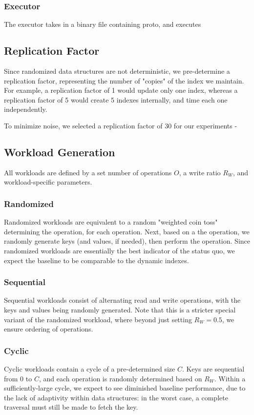 \documentclass[sigconf]{acmart}
\begin{document}
\subsubsection{Executor}
The executor takes in a binary file containing proto, and executes


\subsection{Replication Factor}
Since randomized data structures are not deterministic, we pre-determine a replication factor, representing the number of "copies" of the index we maintain. For example, a replication factor of 1 would update only one index, whereas a replication factor of 5 would create 5 indexes internally, and time each one independently.

To minimize noise, we selected a replication factor of 30 for our experiments - 
\cite{probdist}
\subsection {Workload Generation}
\label{workloads}

All workloads are defined by a set number of operations $O$, a write ratio $R_W$, and workload-specific parameters.

\subsubsection{Randomized}
Randomized workloads are equivalent to a random "weighted coin toss" determining the operation, for each operation. Next, based on a the operation, we randomly generate keys (and values, if needed), then perform the operation. Since randomized workloads are essentially the best indicator of the status quo, we expect the baseline to be comparable to the dynamic indexes.

\subsubsection{Sequential}
Sequential workloads consist of alternating read and write operations, with the keys and values being randomly generated. Note that this is a stricter special variant of the randomized workload, where beyond just setting $R_W=0.5$, we ensure ordering of operations.

\subsubsection{Cyclic}
Cyclic workloads contain a cycle of a pre-determined size $C$. Keys are sequential from $0$ to $C$, and each operation is randomly determined based on $R_W$. Within a sufficiently-large cycle, we expect to see diminished baseline performance, due to the lack of adaptivity within data structures: in the worst case, a complete traversal must still be made to fetch the key.
\end{document}
